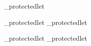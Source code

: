 
\def\brl@char@break_first{20000}
\def\brl@char@break_never{10000}
\def\brl@char@break_almostnever{9999}
\def\brl@char@break_small{-1}
\def\brl@char@break_block{-2}
\def\brl@char@break_middle{-3}
\def\brl@char@break_big{-4}
\def\brl@char@break_bigger{-5}

\def\brl@char@break_break{-10}
\def\brl@char@break_lineend{-50}

%
%
\def\brl@char@break_base{10}






\newif\ifbrl@char@space%
\brl@def_protectedlet\brl@char@space@true\brl@char@spacetrue

\newif\ifbrl@char@bvskip%
\brl@def_protectedlet\brl@char@bvskip@true\brl@char@bvskiptrue
\brl@def_protectedlet\brl@char@bvskip@false\brl@char@bvskipfalse


\newif\ifbrl@char@avskip%
\brl@def_protectedlet\brl@char@avskip@true\brl@char@avskiptrue
\brl@def_protectedlet\brl@char@avskip@false\brl@char@avskipfalse




\newif\ifbrl@char@draw


\def\brl@char_space#1{%
  \brl@char@spacefalse%
  {%
    \let\brl@do\brl@do_space%
    \let\brl@char@cmd_direct\@gobble%
    #1%
    \ifbrl@char@space%
      \aftergroup\brl@char@spacetrue%
    \fi%
  }%
}


